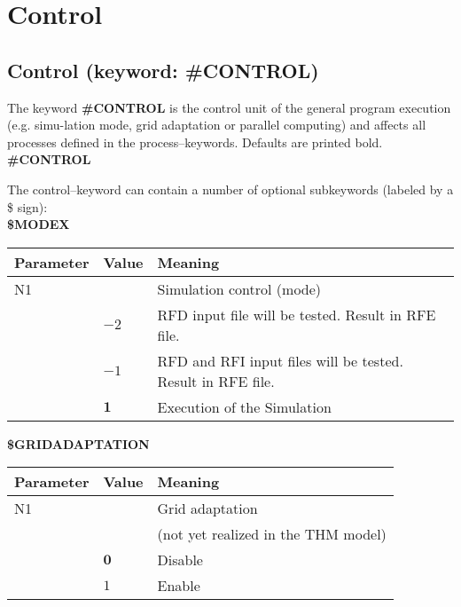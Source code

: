 \section{Control}
\subsection{Control (keyword: \#CONTROL)}

The keyword {\bf \#CONTROL} is the control unit of the general program execution (e.g.
simu-lation mode, grid adaptation or parallel computing) and affects all processes
defined in the
process--keywords. Defaults are printed bold.\\

{\bf \#CONTROL}

The control--keyword can contain a number of optional subkeywords
(labeled by a \$ sign):\\

\hspace{1cm} {\bf \$MODEX}

\begin{center}
\begin{tabular*}{13cm}{|p{}|p{}|p{8.75cm}|} \hline
Parameter& Value & Meaning \\ \hline \hline
%
N1 &     & Simulation control (mode) \\
   &$-2$ & RFD input file will be tested. Result in RFE file. \\
   &$-1$ & RFD and RFI input files will be tested. Result in RFE
   file.
   \\
   &$ \mathbf 1$& Execution of the Simulation \\ \hline
\end{tabular*}
\end{center}

\vspace{0.5cm}

\hspace{1cm} {\bf \$GRIDADAPTATION}

\begin{center}
\begin{tabular*}{13cm}{|p{}|p{}|p{8.75cm}|} \hline
Parameter& Value & Meaning \\ \hline \hline
%
N1 &     & Grid adaptation \\
&&(not yet realized in the THM model)\\
   &$\mathbf 0$ & Disable \\
   &$1$ & Enable \\ \hline
\end{tabular*}
\end{center}

